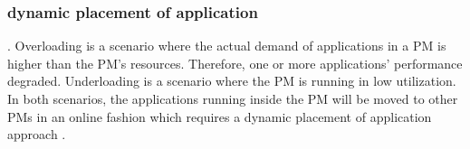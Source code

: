 


\subsubsection{dynamic placement of application}

. Overloading is a scenario where the actual demand of applications in a PM is higher than the PM's resources. Therefore, one or more applications' performance degraded. Underloading is a scenario where the PM is running in low utilization. In both scenarios, the applications running inside the PM will be moved to other PMs in an online fashion which requires a dynamic placement of application approach \cite{Borodin:2cY4439E}.




